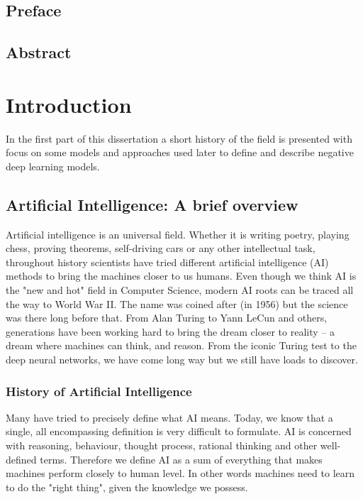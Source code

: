 \documentclass[b5paper]{book}
\begin{document}
\chapter{Preface}
\chapter{Abstract}

\tableofcontents

\mainmatter

\part{Introduction}

In the first part of this dissertation a short history of the field is presented with focus on some models and approaches used later to define and describe negative deep learning models. 

\chapter{Artificial Intelligence: A brief overview}

Artificial intelligence is an universal field. Whether it is writing poetry, playing chess, proving theorems, self-driving cars or any other intellectual task, throughout history scientists have tried different artificial intelligence (AI) methods to bring the machines closer to us humans. Even though we think AI is the "new and hot" field in Computer Science, modern AI roots can be traced all the way to World War II. The name was coined after (in 1956) but the science was there long before that. From Alan Turing to Yann LeCun and others, generations have been working hard to bring the dream closer to reality -- a dream where machines can think, and reason. From the iconic Turing test to the deep neural networks, we have come long way but we still have loads to discover.

\section{History of Artificial Intelligence}

Many have tried to precisely define what AI means. Today, we know that a single, all encompassing definition is very difficult to formulate. AI is concerned with reasoning, behaviour, thought process, rational thinking and other well-defined terms. Therefore we define AI as a sum of everything that makes machines perform closely to human level. In other words machines need to learn to do the "right thing", given the knowledge we possess.
\end{document}
